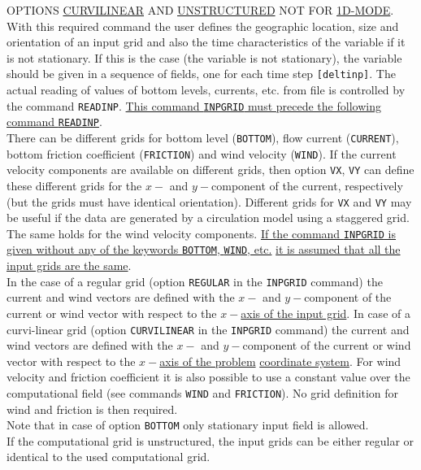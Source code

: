 \documentclass[12pt]{book}
\begin{document}
\noindent
OPTIONS \underline{CURVILINEAR} AND \underline{UNSTRUCTURED} NOT FOR \underline{1D-MODE}.
\\[2ex]
\noindent
With this required command the user defines the geographic location, size and orientation of an input grid
and also the time characteristics of the variable if it is not stationary. If this is the case (the variable is not
stationary), the variable should be given in a sequence of fields, one for each time step {\tt [deltinp]}. The
actual reading of values of bottom levels, currents, etc. from file is controlled by the command {\tt READINP}.
\underline{This command {\tt INPGRID} must precede the following command {\tt READINP}}.
\\[2ex]
\noindent
There can be different grids for bottom level ({\tt BOTTOM}), flow current ({\tt CURRENT}), bottom friction coefficient
({\tt FRICTION}) and wind velocity ({\tt WIND}). If the current velocity components are available on different grids,
then option {\tt VX}, {\tt VY} can define these different grids for the $x-$ and $y-$component of the current, respectively
(but the grids must have identical orientation). Different grids for {\tt VX} and {\tt VY} may be useful if the data are
generated by a circulation model using a staggered grid. The same holds for the wind velocity
components. \underline{If the command {\tt INPGRID} is given without any of the keywords {\tt BOTTOM}, {\tt WIND}, etc.}
\underline{it is assumed that all the input grids are the same}.
\\[2ex]
\noindent
In the case of a regular grid (option {\tt REGULAR} in the {\tt INPGRID} command) the current and wind vectors
are defined with the $x-$ and $y-$component of the current or wind vector with respect to the \underline{$x-$axis of the input
grid}. In case of a curvi-linear grid (option {\tt CURVILINEAR} in the {\tt INPGRID} command) the current and wind
vectors are defined with the $x-$ and $y-$component of the current or wind vector with respect to the \underline{$x-$axis of
the problem} \underline{coordinate system}. For wind velocity and friction coefficient it is also possible to use a
constant value over the computational field (see commands {\tt WIND} and {\tt FRICTION}). No grid definition for
wind and friction is then required.
\\[2ex]
\noindent
Note that in case of option {\tt BOTTOM} only stationary input field is allowed.
\\[2ex]
\noindent
If the computational grid is unstructured, the input grids can be either regular or identical to the used computational grid.
\end{document}
